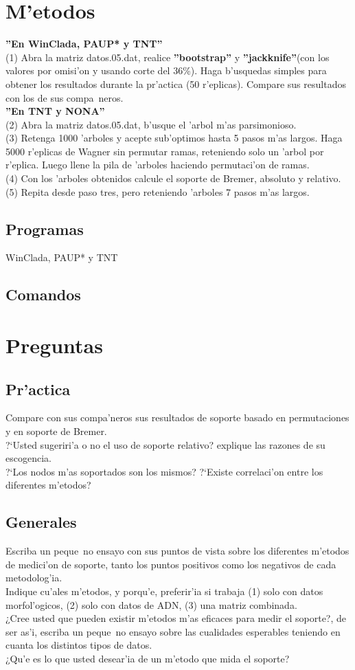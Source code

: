 \section{M'etodos}
\textbf{''En WinClada, PAUP* y TNT''}\\
(1) Abra la matriz datos.05.dat, realice \textbf{''bootstrap''} y \textbf{''jackknife''}(con los valores por omisi'on y usando corte del 36\%). Haga b'usquedas simples para obtener los resultados durante la pr'actica (50 r'eplicas). Compare sus resultados con los de sus compa~neros.\\
\textbf{''En TNT y NONA''}\\
(2) Abra la matriz datos.05.dat, b'usque el 'arbol m'as parsimonioso.\\
(3) Retenga 1000 'arboles y acepte sub'optimos hasta  5 pasos m'as largos. Haga 5000 r'eplicas de Wagner sin permutar ramas, reteniendo solo un 'arbol por r'eplica. Luego llene la pila de 'arboles haciendo permutaci'on de ramas.\\
(4) Con los 'arboles obtenidos calcule el soporte de Bremer, absoluto y relativo.\\
(5) Repita desde paso tres, pero reteniendo 'arboles 7 pasos m'as largos.\\
\subsection{Programas}
WinClada, PAUP* y TNT
\subsection{Comandos}
\section{Preguntas}
\subsection{Pr'actica}
Compare con sus compa'neros sus resultados de soporte basado en permutaciones y en soporte de Bremer.\\
?`Usted sugeriri'a o no el uso de soporte relativo? explique las razones de su escogencia.\\
?`Los nodos m'as soportados son los mismos? ?`Existe correlaci'on entre los diferentes m'etodos?\\
\subsection{Generales}
Escriba un peque~no ensayo con sus puntos de vista sobre los diferentes m'etodos de medici'on de soporte, tanto los puntos positivos como los negativos de cada metodolog'ia.\\
Indique cu'ales m'etodos, y porqu'e, preferir'ia si trabaja  (1) solo con datos morfol'ogicos, (2) solo con datos de ADN, (3) una matriz combinada.\\
¿Cree usted que pueden existir m'etodos m'as eficaces para medir el soporte?, de ser as'i, escriba un peque~no ensayo sobre las cualidades esperables teniendo en cuanta los distintos tipos de datos.\\
¿Qu'e es lo que usted desear'ia de un m'etodo que mida el soporte?\\
